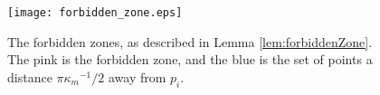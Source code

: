 \documentclass{article}
\numberwithin{cntr}{section}
\numberwithin{equation}{section}
\newcommand{\kmax}{{\kappa_{m}}}
\newcommand{\kmaxi}{{\kmax^{-1}}}
\begin{document}
\begin{figure}
\setlength{\unitlength}{0.240900pt}
\ifx\plotpoint\undefined\newsavebox{\plotpoint}\fi
\sbox{\plotpoint}{\rule[-0.200pt]{0.400pt}{0.400pt}}%
\texttt{[image: forbidden\_zone.eps]}

\caption{The forbidden zones, as described in Lemma \ref{lem:forbiddenZone}. The pink is the forbidden zone, and the blue is the set of points a distance $\pi \kmaxi/2$ away from $p_{i}$.}
\label{fig:forbiddenZone}
\end{figure}





\end{document}
